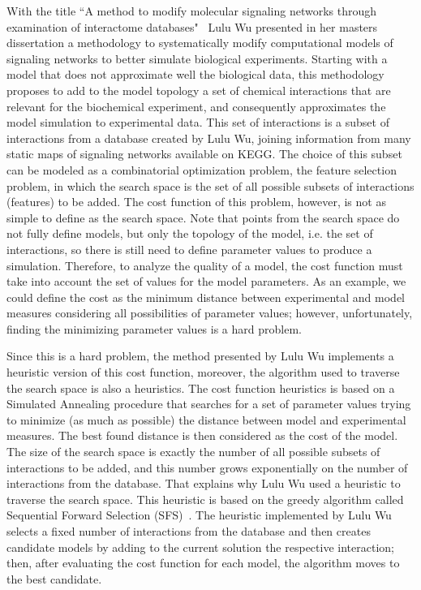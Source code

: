 With the title ``A method to modify molecular signaling networks through
examination of interactome databases"~\cite{Wu15} Lulu Wu presented in 
her masters dissertation a methodology to systematically modify 
computational models of signaling networks to better simulate biological 
experiments. Starting with a model that does not approximate well the 
biological data, this methodology proposes to add to the model topology 
a set of chemical interactions that are relevant for the biochemical 
experiment, and consequently approximates the model simulation to 
experimental data. This set of interactions is a subset of interactions 
from a database created by Lulu Wu, joining information from many static 
maps of signaling networks available on KEGG. The choice of this subset 
can be modeled as a combinatorial optimization problem, the feature 
selection problem, in which the search space is the set of all possible 
subsets of interactions (features) to be added. The cost function of 
this problem, however, is not as simple to define as the search space. 
Note that points from the search space do not fully define models, but 
only the topology of the model, i.e. the set of interactions, so there 
is still need to define parameter values to produce a simulation. 
Therefore, to analyze the quality of a model, the cost function must 
take into account the set of values for the model parameters. As an 
example, we could define the cost as the minimum distance between 
experimental and model measures considering all possibilities of 
parameter values; however, unfortunately, finding the minimizing 
parameter values is a hard problem.

Since this is a hard problem, the method presented by Lulu Wu 
implements a heuristic version of this cost function, moreover, the 
algorithm used to traverse the search space is also a heuristics. The 
cost function heuristics is based on a Simulated Annealing procedure 
that searches for a set of parameter values trying to minimize (as much 
as possible) the distance between model and experimental measures. The 
best found distance is then considered as the cost of the model. The 
size of the search space is exactly the number of all possible subsets
of interactions to be added, and this number grows exponentially on the 
number of interactions from the database. That explains why Lulu Wu used
a heuristic to traverse the search space. This heuristic is based on the 
greedy algorithm called Sequential Forward Selection 
(SFS)~\cite{Whitney1971}. The heuristic implemented by Lulu Wu selects a
fixed number of interactions from the database and then creates 
candidate models by adding to the current solution the respective 
interaction; then, after evaluating the cost function for each model, 
the algorithm moves to the best candidate.

